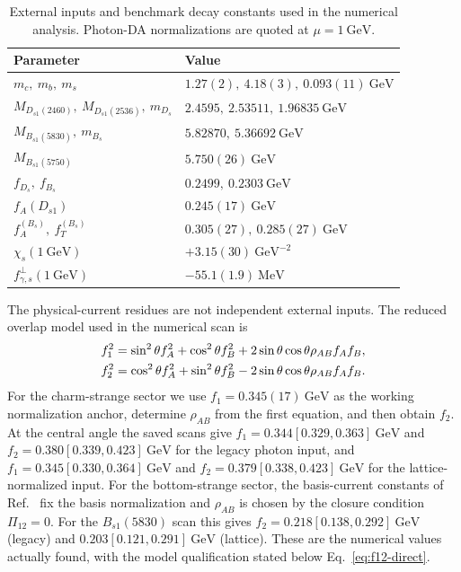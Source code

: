 \documentclass[aps,prd,preprint,nofootinbib,superscriptaddress]{revtex4-2}
\newcommand{\Ds}{D_s}
\newcommand{\Dsone}{D_{s1}}
\newcommand{\Bs}{B_s}
\newcommand{\Bsone}{B_{s1}}
\newcommand{\GeV}{\mathrm{GeV}}
\newcommand{\MeV}{\mathrm{MeV}}
\begin{document}
\begin{table}[h]
\caption{External inputs and benchmark decay constants used in the numerical
analysis.  Photon-DA normalizations are quoted at $\mu=1~\GeV$.}
\label{tab:inputs}
\begin{ruledtabular}
\begin{tabular}{ll}
Parameter & Value \\
\hline
$m_c,\ m_b,\ m_s$
& $1.27(2),\ 4.18(3),\ 0.093(11)~\GeV$
  \cite{ParticleDataGroup:2024cfk} \\
$M_{\Dsone(2460)},\ M_{\Dsone(2536)},\ m_{\Ds}$
& $2.4595,\ 2.53511,\ 1.96835~\GeV$
  \cite{ParticleDataGroup:2024cfk} \\
$M_{\Bsone(5830)},\ m_{\Bs}$
& $5.82870,\ 5.36692~\GeV$
  \cite{ParticleDataGroup:2024cfk,CMS:2018qdl} \\
$M_{\Bsone(5750)}$
& $5.750(26)~\GeV$ \cite{Lang:2015hza} \\
$f_{\Ds},\ f_{\Bs}$
& $0.2499,\ 0.2303~\GeV$
  \cite{FlavourLatticeAveragingGroupFLAG:2024oxs} \\
$f_A(\Dsone)$
& $0.245(17)~\GeV$ \cite{Wang:2015mxa} \\
$f_A^{(B_s)},\ f_T^{(B_s)}$
& $0.305(27),\ 0.285(27)~\GeV$
  \cite{Pullin:2021ebn} \\
$\chi_s(1~\GeV)$
& $+3.15(30)~\GeV^{-2}$ \cite{Rohrwild:2007yt} \\
$f_{\gamma,s}^{\perp}(1~\GeV)$
& $-55.1(1.9)~\MeV$ \cite{Bacchio:2024pij} \\
\end{tabular}
\end{ruledtabular}
\end{table}

The physical-current residues are not independent external inputs.  The
reduced overlap model used in the numerical scan is
\begin{align}
 f_1^2&=\sin^2\theta f_A^2+\cos^2\theta f_B^2
 +2\sin\theta\cos\theta\rho_{AB}f_Af_B,\notag\\
 f_2^2&=\cos^2\theta f_A^2+\sin^2\theta f_B^2
 -2\sin\theta\cos\theta\rho_{AB}f_Af_B.
 \label{eq:residue-overlap-model}
\end{align}
For the charm-strange sector we use $f_1=0.345(17)~\GeV$ as the working
normalization anchor, determine $\rho_{AB}$ from the first equation, and then
obtain $f_2$.  At the central angle the saved scans give
$f_1=0.344[0.329,0.363]~\GeV$ and
$f_2=0.380[0.339,0.423]~\GeV$ for the legacy photon input, and
$f_1=0.345[0.330,0.364]~\GeV$ and
$f_2=0.379[0.338,0.423]~\GeV$ for the lattice-normalized input.  For the
bottom-strange sector, the basis-current constants of
Ref.~\cite{Pullin:2021ebn} fix the basis normalization and $\rho_{AB}$ is
chosen by the closure condition $\Pi_{12}=0$.  For the $\Bsone(5830)$ scan
this gives $f_2=0.218[0.138,0.292]~\GeV$ (legacy) and
$0.203[0.121,0.291]~\GeV$ (lattice).  These are the numerical values actually
found, with the model qualification stated below Eq.~\eqref{eq:f12-direct}.
\end{document}
